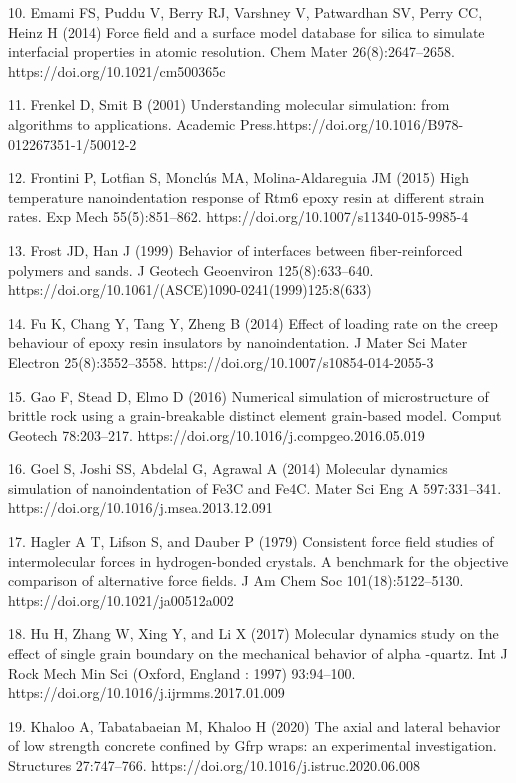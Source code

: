 \documentclass{article}
\begin{document}
\begin{hangpars}
10. Emami FS, Puddu V, Berry RJ, Varshney V, Patwardhan SV, Perry CC, Heinz H (2014) Force field and a surface model database for silica to simulate interfacial properties in atomic resolution. Chem Mater 26(8):2647–2658. https://doi.org/10.1021/cm500365c

11. Frenkel D, Smit B (2001) Understanding molecular simulation: from algorithms to applications. Academic Press.https://doi.org/10.1016/B978-012267351-1/50012-2

12. Frontini P, Lotfian S, Monclús MA, Molina-Aldareguia JM (2015) High temperature nanoindentation response of Rtm6 epoxy resin at different strain rates. Exp Mech 55(5):851–862. https://doi.org/10.1007/s11340-015-9985-4

13. Frost JD, Han J (1999) Behavior of interfaces between fiber-reinforced polymers and sands. J Geotech Geoenviron 125(8):633–640. https://doi.org/10.1061/(ASCE)1090-0241(1999)125:8(633)

14. Fu K, Chang Y, Tang Y, Zheng B (2014) Effect of loading rate on the creep behaviour of epoxy resin insulators by nanoindentation. J Mater Sci Mater Electron 25(8):3552–3558. https://doi.org/10.1007/s10854-014-2055-3

15. Gao F, Stead D, Elmo D (2016) Numerical simulation of microstructure of brittle rock using a grain-breakable distinct element grain-based model. Comput Geotech 78:203–217. https://doi.org/10.1016/j.compgeo.2016.05.019

16. Goel S, Joshi SS, Abdelal G, Agrawal A (2014) Molecular dynamics simulation of nanoindentation of Fe3C and Fe4C. Mater Sci Eng A 597:331–341. https://doi.org/10.1016/j.msea.2013.12.091

17. Hagler A T, Lifson S, and Dauber P (1979) Consistent force field studies of intermolecular forces in hydrogen-bonded crystals. A benchmark for the objective comparison of alternative force fields. J Am Chem Soc 101(18):5122–5130. https://doi.org/10.1021/ja00512a002

18. Hu H, Zhang W, Xing Y, and Li X (2017) Molecular dynamics study on the effect of single grain boundary on the mechanical behavior of alpha -quartz. Int J Rock Mech Min Sci (Oxford, England : 1997) 93:94–100. https://doi.org/10.1016/j.ijrmms.2017.01.009

19. Khaloo A, Tabatabaeian M, Khaloo H (2020) The axial and lateral behavior of low strength concrete confined by Gfrp wraps: an experimental investigation. Structures 27:747–766. https://doi.org/10.1016/j.istruc.2020.06.008


\end{hangpars}
\end{document}
